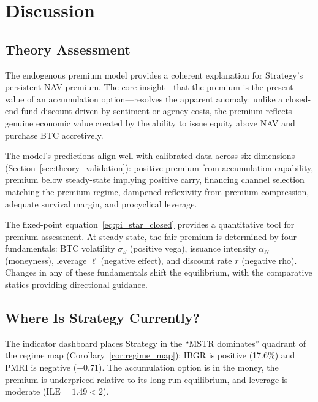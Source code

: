 
\section{Discussion}\label{sec:discussion}

\subsection{Theory Assessment}

The endogenous premium model provides a coherent explanation for Strategy's
persistent NAV premium.  The core insight---that the premium is the present
value of an accumulation option---resolves the apparent anomaly: unlike a
closed-end fund discount driven by sentiment or agency costs, the premium
reflects genuine economic value created by the ability to issue equity above
NAV and purchase BTC accretively.

The model's predictions align well with calibrated data across six
dimensions (Section~\ref{sec:theory_validation}): positive premium from
accumulation capability, premium below steady-state implying positive carry,
financing channel selection matching the premium regime, dampened reflexivity
from premium compression, adequate survival margin, and procyclical leverage.

The fixed-point equation~\eqref{eq:pi_star_closed} provides a quantitative
tool for premium assessment.  At steady state, the fair premium is determined
by four fundamentals: BTC volatility $\sigma_S$ (positive vega), issuance
intensity $\alpha_N$ (moneyness), leverage $\ell$ (negative effect), and
discount rate $r$ (negative rho).  Changes in any of these fundamentals
shift the equilibrium, with the comparative statics providing directional
guidance.

\subsection{Where Is Strategy Currently?}

The indicator dashboard places Strategy in the ``MSTR dominates'' quadrant
of the regime map (Corollary~\ref{cor:regime_map}): IBGR is positive
(17.6\%) and PMRI is negative ($-0.71$).  The accumulation option is in the
money, the premium is underpriced relative to its long-run equilibrium,
and leverage is moderate ($\mathrm{ILE} = 1.49 < 2$).

